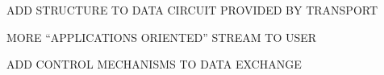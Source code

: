 



\begin{bwslide}

\begin{nrtc}
\item	ADD STRUCTURE TO DATA CIRCUIT PROVIDED BY TRANSPORT
\item	MORE ``APPLICATIONS ORIENTED'' STREAM TO USER
\item	ADD CONTROL MECHANISMS TO DATA EXCHANGE
\end{nrtc}
\end{bwslide}




%


%


